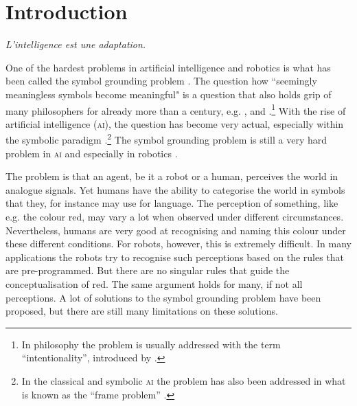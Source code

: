 \chapter{Introduction}\label{ch:intro}

\epigraph{\itshape L'intelligence est une adaptation.\\[-2\baselineskip]}{\citep{piaget:1966}}

\noindent One of the hardest problems in artificial intelligence and robotics is what has been called the {\sc symbol grounding problem} \citep{harnad:1990}. The question how ``seemingly meaningless symbols become meaningful" \citep{harnad:1990} is a question that also holds grip of many philosophers for already more than a century, e.g. \citet{bretano:1874}, \citet{searle:1980} and \citet{dennett:1991}.\footnote{In philosophy the problem is usually addressed with the term ``intentionality'', introduced by \citet{bretano:1874}.} With the rise of artificial intelligence {\scshape (ai)}, the question has become very actual, especially within the symbolic paradigm \citep{newell:1990}.\footnote{In the classical and symbolic {\scshape ai} the problem has also been addressed in what is known as the ``frame problem'' \citep{pylyshyn:1987}.} The symbol grounding problem is still a very hard problem in {\scshape ai} and especially in robotics \citep{pfeiferscheier:1999}.

The problem is that an agent, be it a robot or a human, perceives the world in analogue signals. Yet humans have the ability to categorise the world in symbols that they, for instance may use for language. The perception of something, like e.g. the colour red, may vary a lot when observed under different circumstances. Nevertheless, humans are very good at recognising and naming this colour under these different conditions. For robots, however, this is extremely difficult. In many applications the robots try to recognise such perceptions based on the rules that are pre-programmed. But there are no singular rules that guide the conceptualisation of red. The same argument holds for many, if not all perceptions. A lot of solutions to the symbol grounding problem have been proposed, but there are still many limitations on these solutions. 

